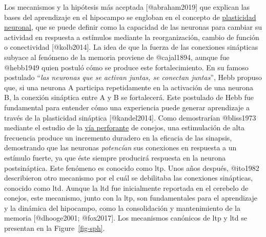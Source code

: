 \documentclass[
  11pt]{../MastersDoctoralThesisUNAM}
\begin{document}
Los mecanismos y la hipótesis más aceptada {[}@abraham2019{]} que
explican las bases del aprendizaje en el hipocampo se engloban en el
concepto de \href{AppendixB.qmd\#term-id-15}{plasticidad neuronal}, que
se puede definir como la capacidad de las neuronas para cambiar su
actividad en respuesta a estímulos mediante la reorganización, cambio de
función o conectividad {[}@kolb2014{]}. La idea de que la fuerza de las
conexiones sinápticas subyace al fenómeno de la memoria proviene de
@cajal1894, aunque fue @hebb1949 quien postuló cómo se produce este
fortalecimiento. En su famoso postulado ``\emph{las neuronas que se
activan juntas, se conectan juntas}'', Hebb propuso que, si una neurona
A participa repetidamente en la activación de una neurona B, la conexión
sináptica entre A y B se fortalecerá. Este postulado de Hebb fue
fundamental para entender cómo una experiencia puede generar aprendizaje
a través de la plasticidad sináptica {[}@kandel2014{]}. Como
demostrarían @bliss1973 mediante el estudio de la
\href{AppendixB.qmd\#term-id-61}{vía perforante} de conejos, una
estimulación de alta frecuencia produce un incremento duradero en la
eficacia de las sinapsis, demostrando que las neuronas \emph{potencían}
sus conexiones en respuesta a un estímulo
\colorbox{BurntOrange}{fuerte, ya que éste siempre producirá respuesta en la neurona postsináptica}.
Este fenómeno es conocido como \ac{ltp}. Unos años después, @ito1982
describieron otro mecanismo por el cuál se debilitaba las conexiones
sinápticas, conocido como \ac{ltd}. Aunque la \ac{ltd} fue inicialmente
reportada en el cerebelo de conejos, este mecanismo, junto con la
\ac{ltp}, son fundamentales para el aprendizaje y la dinámica del
hipocampo, como la consolidación y mantenimiento de la memoria
{[}@dhooge2001; @fox2017{]}. Los mecanismos canónicos de \ac{ltp} y
\ac{ltd} se presentan en la Figure~\ref{fig-sph}.
\end{document}
